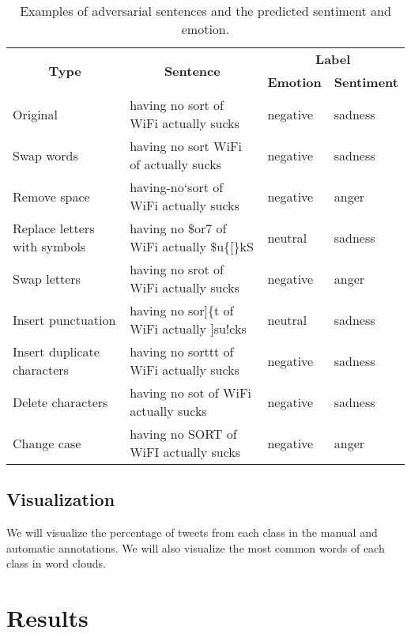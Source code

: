 \documentclass[11pt,a4paper]{article}
\begin{document}
\begin{table*}[ht]
\centering
\begin{tabular}{|l|l|ll|}
\hline
\multicolumn{1}{|c|}{\multirow{2}{*}{\textbf{Type}}} & \multicolumn{1}{c|}{\multirow{2}{*}{\textbf{Sentence}}} & \multicolumn{2}{c|}{\textbf{Label}} \\ \cline{3-4} 
\multicolumn{1}{|c|}{} & \multicolumn{1}{c|}{} & \multicolumn{1}{c|}{\textbf{Emotion}} & \multicolumn{1}{c|}{\textbf{Sentiment}} \\ \hline
Original & having no sort of WiFi actually sucks & \multicolumn{1}{l|}{negative} & sadness \\ \hline
Swap words & having no sort WiFi of actually sucks & \multicolumn{1}{l|}{negative} & sadness \\ \hline
Remove space & having-no`sort of WiFi actually sucks & \multicolumn{1}{l|}{negative} & anger \\ \hline
Replace letters with symbols & having no \$or7 of WiFi actually \$u\{[\}kS & \multicolumn{1}{l|}{neutral} & sadness \\ \hline
Swap letters & having no srot of WiFi actually sucks & \multicolumn{1}{l|}{negative} & anger \\ \hline
Insert punctuation & having no sor{]}\{t of WiFi actually {]}su!cks & \multicolumn{1}{l|}{neutral} & sadness \\ \hline
Insert duplicate characters & having no sorttt of WiFi actually sucks & \multicolumn{1}{l|}{negative} & sadness \\ \hline
Delete characters & having no sot of WiFi actually sucks & \multicolumn{1}{l|}{negative} & sadness \\ \hline
Change case & having no SORT of WiFI actually sucks & \multicolumn{1}{l|}{negative} & anger \\ \hline
\end{tabular}
\caption{Examples of adversarial sentences and the predicted sentiment and emotion.}
\label{tab:adversarial}
\end{table*}

\subsection{Visualization}

We will visualize the percentage of tweets from each class in the manual and automatic annotations. We will also visualize the most common words of each class in word clouds.

\section{Results}
\end{document}
